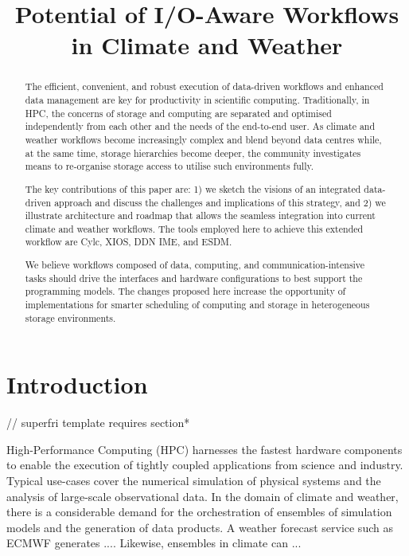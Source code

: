 \documentclass{superfri}
\newcommand{\jk}[1]{\todo[inline]{JK: #1}}
\begin{document}
\author{}

\title{Potential of I/O-Aware Workflows in Climate and Weather}

\maketitle{}

\begin{abstract}%
The efficient, convenient, and robust execution of data-driven workflows and enhanced data management are key for productivity in scientific computing.
Traditionally, in HPC, the concerns of storage and computing are separated and optimised independently from each other and the needs of the end-to-end user.
As climate and weather workflows become increasingly complex and blend beyond data centres while, at the same time, storage hierarchies become deeper, the community investigates means to re-organise storage access to utilise such environments fully.

The key contributions of this paper are:
1) we sketch the visions of an integrated data-driven approach and discuss the challenges and implications of this strategy, and 2) we illustrate architecture and roadmap that allows the seamless integration into current climate and weather workflows.
The tools employed here to achieve this extended workflow are Cylc, XIOS, DDN IME, and ESDM.

We believe workflows composed of data, computing, and communication-intensive tasks should drive the interfaces and hardware configurations to best support the programming models.
The changes proposed here increase the opportunity of implementations for smarter scheduling of computing and storage in heterogeneous storage environments.

\end{abstract}

\section{Introduction}  // superfri template requires section*
\label{sec:intro}

High-Performance Computing (HPC) harnesses the fastest hardware components to enable the execution of tightly coupled applications from science and industry.
Typical use-cases cover the numerical simulation of physical systems and the analysis of large-scale observational data.
In the domain of climate and weather, there is a considerable demand for the orchestration of ensembles of simulation models and the generation of data products.
A weather forecast service such as ECMWF generates .... \jk{Cylc team, please provide some facts}
Likewise, ensembles in climate can ...
\end{document}
